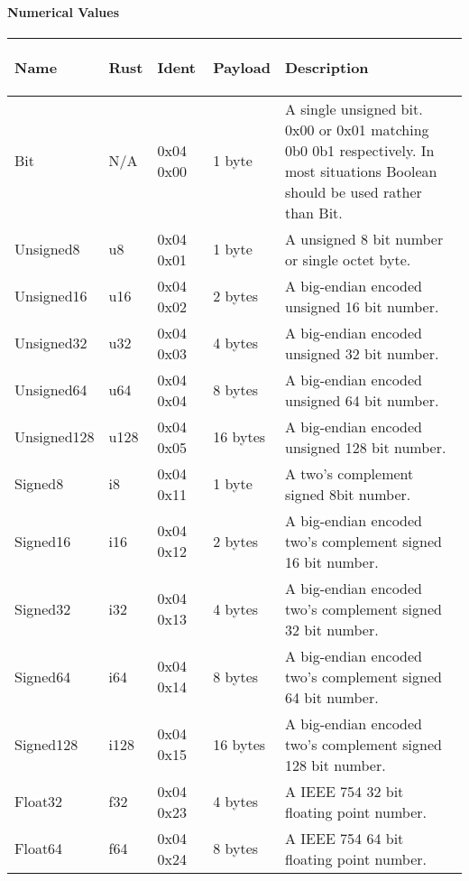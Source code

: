 \documentclass{report}
\begin{document}
\paragraph{Numerical Values}
\begin{adjustwidth}{-1.5cm}{}
\begin{tabular}{| m{5.5em} | m{4.5em} | m{5em} | m{7em} | m{12em} |}
\hline
\begin{center} \textbf{Name} \end{center} &
 \begin{center} \textbf{Rust} \end{center} &
  \begin{center} \textbf{Ident} \end{center} &
   \begin{center} \textbf{Payload} \end{center} &
    \begin{center} \textbf{Description} \end{center} \\
\hline
Bit & N/A & 0x04 0x00 & 1 byte & A single unsigned bit. 0x00 or 0x01 matching 0b0 0b1 respectively.
 In most situations Boolean should be used rather than Bit. \\
\hline
Unsigned8 & u8 & 0x04 0x01 & 1 byte & A unsigned 8 bit number or single octet byte. \\
\hline
Unsigned16 & u16 & 0x04 0x02 & 2 bytes & A big-endian encoded unsigned 16 bit number. \\
\hline
Unsigned32 & u32 & 0x04 0x03 & 4 bytes & A big-endian encoded unsigned 32 bit number. \\
\hline
Unsigned64 & u64 & 0x04 0x04 & 8 bytes & A big-endian encoded unsigned 64 bit number. \\
\hline
Unsigned128 & u128 & 0x04 0x05 & 16 bytes & A big-endian encoded unsigned 128 bit number. \\
\hline
Signed8 & i8 & 0x04 0x11 & 1 byte & A two's complement signed 8bit number. \\
\hline
Signed16 & i16 & 0x04 0x12 & 2 bytes & A big-endian encoded two's complement signed 16 bit number. \\
\hline
Signed32 & i32 & 0x04 0x13 & 4 bytes & A big-endian encoded two's complement signed 32 bit number. \\
\hline
Signed64 & i64 & 0x04 0x14 & 8 bytes & A big-endian encoded two's complement signed 64 bit number. \\
\hline
Signed128 & i128 & 0x04 0x15 & 16 bytes & A big-endian encoded two's complement signed 128 bit number. \\
\hline
Float32 & f32 & 0x04 0x23 & 4 bytes & A IEEE 754 32 bit floating point number. \\
\hline
Float64 & f64 & 0x04 0x24 & 8 bytes & A IEEE 754 64 bit floating point number. \\
\hline
\end{tabular}
\end{adjustwidth}
\end{document}
